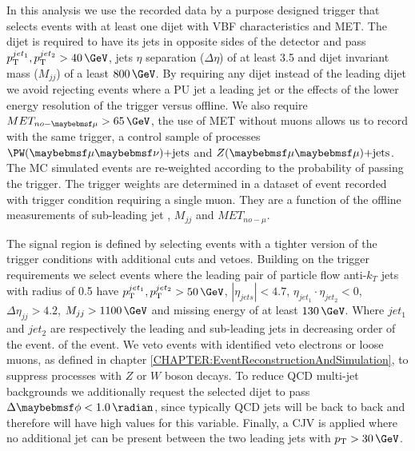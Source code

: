 

In this analysis we use the recorded data by a purpose designed trigger that selects events with at least one dijet with \gls{VBF} characteristics and \gls{MET}. The dijet is required to have its jets in opposite sides of the detector and pass $\pt^{jet_1},\pt^{jet_2} > 40\,\GeV$, jets $\eta$ separation ($\Delta\eta$) of at least 3.5 and dijet invariant mass ($M_{jj}$) of a least $800\,\GeV$. By requiring any dijet instead of the leading dijet we avoid rejecting events where a \gls{PU} jet a leading jet or the effects of the lower energy resolution of the trigger versus offline. We also require $MET_{no-\mu} > 65\,\GeV$, the use of \gls{MET} without muons allows us to record with the same trigger, a control sample of processes  $\PW(\mu\nu)\text{+jets}$ and $\Z(\mu\mu)\text{+jets}$. The \gls{MC} simulated events are re-weighted according to the probability of passing the trigger. The trigger weights are determined in a dataset of event recorded with trigger condition requiring a single muon. They are a function of the offline measurements of sub-leading jet \pt, $M_{jj}$ and $MET_{no-\mu}$.

The signal region is defined by selecting events with a tighter version of the trigger conditions with additional cuts and vetoes. Building on the trigger requirements we select events where the leading pair of particle flow anti-$k_T$ jets with radius of 0.5 have $\pt^{jet_1},\pt^{jet_2} > 50\,\GeV$, $|\eta_{jets}| < 4.7$, $\eta_{jet_1} \cdot \eta_{jet_2} < 0$, $\Delta\eta_{jj}>4.2$, $M_{jj}>1100\,\GeV$ and missing energy of at least $130\,\GeV$. Where $jet_1$ and $jet_2$ are respectively the leading and sub-leading jets in decreasing \pt order of the event. of the event. We veto events with identified veto electrons or loose muons, as defined in chapter \ref{CHAPTER:EventReconstructionAndSimulation}, to suppress processes with $Z$ or $W$ boson decays. To reduce \gls{QCD} multi-jet backgrounds we additionally request the selected dijet to pass $\Delta\phi < 1.0\,\radian$, since typically \gls{QCD} jets will be back to back and therefore will have high values for this variable. Finally, a \acrfull{CJV} is applied where no additional jet can be present between the two leading jets with $\pt > 30\,\GeV$.

